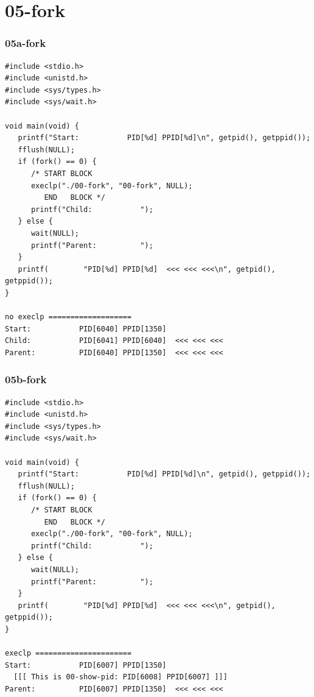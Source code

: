 \documentclass[xcolor=table, notheorems, hyperref={pdfpagelabels=false}]{beamer}
\begin{document}
\section{05-fork}
\begin{frame}[fragile]
\frametitle{05a-fork}
\begin{lstlisting}[basicstyle=\ttfamily\tiny]
#include <stdio.h>
#include <unistd.h>
#include <sys/types.h>
#include <sys/wait.h>

void main(void) {
   printf("Start:           PID[%d] PPID[%d]\n", getpid(), getppid());
   fflush(NULL);
   if (fork() == 0) {
      /* START BLOCK
      execlp("./00-fork", "00-fork", NULL);
         END   BLOCK */
      printf("Child:           ");
   } else {
      wait(NULL);
      printf("Parent:          ");
   }
   printf(        "PID[%d] PPID[%d]  <<< <<< <<<\n", getpid(), getppid());
}

no execlp ===================
Start:           PID[6040] PPID[1350]
Child:           PID[6041] PPID[6040]  <<< <<< <<<
Parent:          PID[6040] PPID[1350]  <<< <<< <<<

\end{lstlisting}
\end{frame}

\begin{frame}[fragile]
\frametitle{05b-fork}
\begin{lstlisting}[basicstyle=\ttfamily\tiny]
#include <stdio.h>
#include <unistd.h>
#include <sys/types.h>
#include <sys/wait.h>

void main(void) {
   printf("Start:           PID[%d] PPID[%d]\n", getpid(), getppid());
   fflush(NULL);
   if (fork() == 0) {
      /* START BLOCK
         END   BLOCK */
      execlp("./00-fork", "00-fork", NULL);
      printf("Child:           ");
   } else {
      wait(NULL);
      printf("Parent:          ");
   }
   printf(        "PID[%d] PPID[%d]  <<< <<< <<<\n", getpid(), getppid());
}

execlp ======================
Start:           PID[6007] PPID[1350]
  [[[ This is 00-show-pid: PID[6008] PPID[6007] ]]]
Parent:          PID[6007] PPID[1350]  <<< <<< <<<

\end{lstlisting}
\end{frame}
\end{document}
